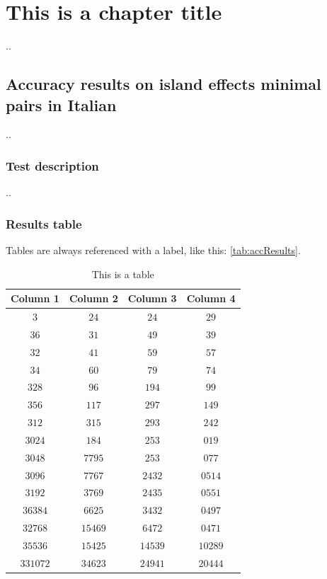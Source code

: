 \chapter{This is a chapter title}

..

\section{Accuracy results on island effects minimal pairs in Italian}

..

\subsection{Test description}

..

\subsection{Results table}


Tables are always referenced with a label, like this: \autoref{tab:accResults}.

\begin{table}
	
	\begin{center}
		\begin{tabular}{c|c|c|c}
			\textbf{Column 1} & \textbf{Column 2} & \textbf{Column 3} & \textbf{Column 4} \\
			\hline
			$3$      & $24$     & $24$    & $29$ \\ 
			$36$     & $31$     & $49$    & $39$ \\ 
			$32$     & $41$     & $59$    & $57$ \\ 
			$34$     & $60$     & $79$    & $74$ \\ 
			$328$    & $96$     & $194$   & $99$ \\ 
			$356$    & $117$    & $297$   & $149$ \\ 
			$312$    & $315$    & $293$   & $242$ \\ 
			$3024$   & $184$    & $253$   & $019$ \\ 
			$3048$   & $7795$   & $253$   & $077$ \\ 
			$3096$   & $7767$   & $2432$  & $0514$ \\ 
			$3192$   & $3769$   & $2435$  & $0551$ \\ 
			$36384$  & $6625$   & $3432$  & $0497$ \\ 
			$32768$  & $15469$  & $6472$  & $0471$ \\ 
			$35536$  & $15425$  & $14539$ & $10289$ \\ 
			$331072$ & $34623$  & $24941$ & $20444$ \\  
		\end{tabular}
		\caption{This is a table}
		\label{tab:accResults}
	\end{center}
\end{table}

